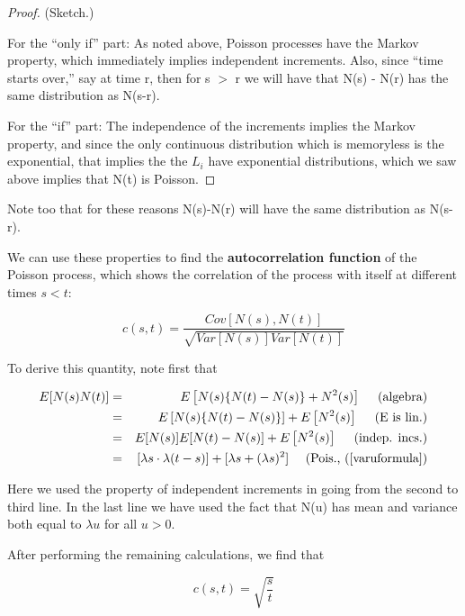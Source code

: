 \begin{proof}

(Sketch.)

For the ``only if'' part:  As noted above, Poisson processes have the
Markov property, which immediately implies independent increments.
Also, since ``time starts over,'' say at time r, then for s $>$ r we
will have that N(s) - N(r) has the same distribution as N(s-r).

For the ``if'' part:  The independence of the increments implies the
Markov property, and since the only continuous distribution which is
memoryless is the exponential, that implies the the $L_i$ have
exponential distributions, which we saw above implies that N(t) is
Poisson.

\end{proof}

Note too that for these reasons N(s)-N(r) will have the same
distribution as N(s-r).

We can use these properties to find the {\bf autocorrelation function}
of the Poisson process, which shows the correlation of the process with
itself at different times $s < t$:

\begin{equation}
c(s,t) = \frac{Cov[N(s),N(t)]}
{\sqrt{Var[N(s)] Var[N(t)]}}
\end{equation}

To derive this quantity, note first that

\begin{eqnarray}
E[N(s)N(t)] &=& E\left[N(s) \{N(t)-N(s)\} + N^2(s)\right]~~~~
   \textrm{(algebra)} \\ 
&=& E\left[N(s) \{N(t)-N(s)\}\right] + E\left[N^2(s)\right] ~~~~
   \textrm{(E is lin.)} \\
&=& E[N(s)] E[N(t)-N(s)] + E\left[N^2(s)\right] ~~~~
   \textrm{(indep. incs.)} \\
&=& [\lambda s \cdot \lambda (t-s)] + [\lambda s + (\lambda s)^2] ~~~~
   \textrm{(Pois., $(\ref{varuformula})$}
\end{eqnarray}


Here we used the property of independent increments in going from the
second to third line.  In the last line we have used the fact that N(u)
has mean and variance both equal to $\lambda u$ for all $u > 0$.

After performing the remaining calculations, we find that

\begin{equation}
c(s,t) = \sqrt{\frac{s}{t}}
\end{equation}

